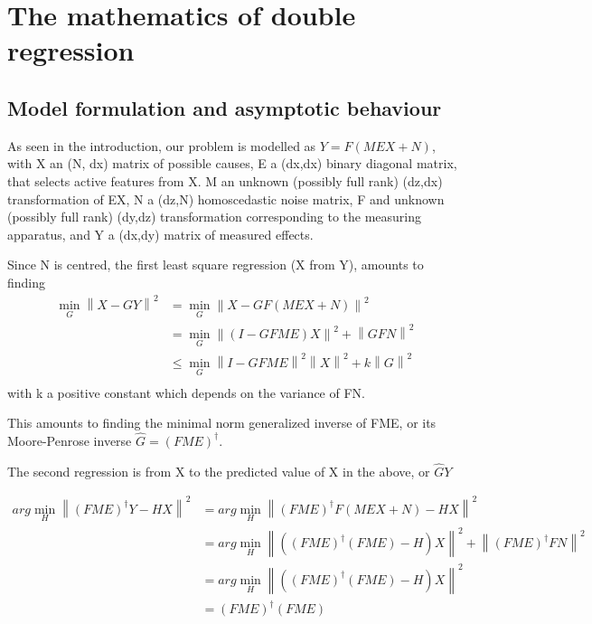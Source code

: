 \documentclass{article}
\begin{document}
\section{The mathematics of double regression}

\subsection{Model formulation and asymptotic behaviour}

As seen in the introduction, our problem is modelled as $Y = F(MEX + N)$, with X an (N, dx) matrix of possible causes, E a (dx,dx) binary diagonal matrix, that selects active features from X. M an unknown (possibly full rank) (dz,dx) transformation of EX, N a (dz,N) homoscedastic noise matrix, F and unknown (possibly full rank) (dy,dz) transformation corresponding to the measuring apparatus, and Y a (dx,dy) matrix of measured effects.

Since N is centred, the first least square regression (X from Y), amounts to finding
\begin{equation}
\begin{aligned}
\min_G \left \| X-GY \right \|^2 &= \min_G \left \| X - GF(MEX+N)\right\|^2 \\
&{}= \min_G \left \| (I-GFME)X\right\| ^2 + \left \| GFN\right \| ^2\\
&{}\leq \min_G \left \| I-GFME\right\| ^2 \left \| X\right\| ^2 + k\left \| G\right \| ^2\\ 
\end{aligned}
\end{equation}
with k a positive constant which depends on the variance of FN.

This amounts to finding the minimal norm generalized inverse of FME, or its Moore-Penrose inverse $\hat  G= (FME)^{\dagger}$.

The second regression is from X to the predicted value of X in the above, or $\hat G  Y$

\begin{equation}
\begin{aligned}
arg \min_H \left \| (FME)^{\dagger}Y - HX \right \|^2 &= arg \min_H \left \| (FME)^{\dagger}F(MEX+N) - HX \right \|^2 \\
&= arg \min_H \left \| ((FME)^{\dagger}(FME)-H)X \right \| ^2 + \left \| (FME)^{\dagger}FN \right \| ^2\\
&= arg \min_H \left \| ((FME)^{\dagger}(FME)-H)X \right \| ^2\\
&=(FME)^{\dagger}(FME)
\end{aligned}
\end{equation}
\end{document}
